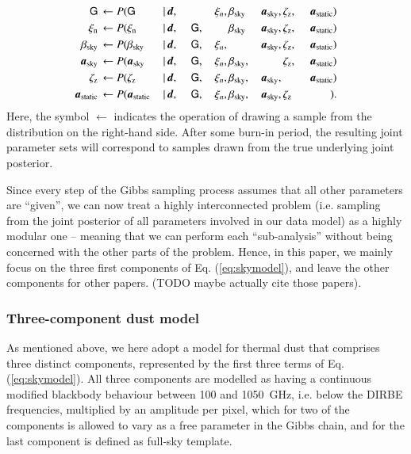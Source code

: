 \documentclass{aa}
\newcommand{\dv}[0]{\vec{d}}
\newcommand{\G}[0]{\tens{G}}
\renewcommand{\a}[0]{\vec{a}}
\begin{document}
\begin{alignat}{11}
\G &\,\leftarrow P(\G&\,\mid &\,\dv,&\, &\,\phantom{\G} &\,\xi_n, &
\,\beta_{\mathrm{sky}}& \,\a_{\mathrm{sky}}, &\,\zeta_{\mathrm{z}},
&\,\a_{\mathrm{static}})\label{eq:gibbs_G}\\
\xi_{\mathrm{n}} &\,\leftarrow P(\xi_{\mathrm{n}}&\,\mid &\,\dv,&\, &\,\G, &\,\phantom{\xi_n} &
\,\beta_{\mathrm{sky}}& \,\a_{\mathrm{sky}}, &\,\zeta_{\mathrm{z}},
&\,\a_{\mathrm{static}})\\
\beta_{\mathrm{sky}} &\,\leftarrow P(\beta_{\mathrm{sky}}&\,\mid &\,\dv,&\, &\,\G, &\,\xi_n, &
\,\phantom{\beta_{\mathrm{sky}}}& \,\a_{\mathrm{sky}}, &\,\zeta_{\mathrm{z}}, &\,\a_{\mathrm{static}})\\
\a_{\mathrm{sky}} &\,\leftarrow P(\a_{\mathrm{sky}}&\,\mid &\,\dv,&\, &\,\G, &\,\xi_n, &
\,\beta_{\mathrm{sky}},& \,\phantom{\a_{\mathrm{sky}},}
&\,\zeta_{\mathrm{z}}, &\,\a_{\mathrm{static}})\\
\zeta_{\mathrm{z}} &\,\leftarrow P(\zeta_{\mathrm{z}}&\,\mid &\,\dv,&\, &\,\G, &\,\xi_n, &
\,\beta_{\mathrm{sky}},& \,\a_{\mathrm{sky}},
&\,\phantom{\zeta_{\mathrm{z}},} &\,\a_{\mathrm{static}})\label{eq:gibbs_zodi}\\
\a_{\mathrm{static}} &\,\leftarrow P(\a_{\mathrm{static}}&\,\mid &\,\dv,&\, &\,\G, &\,\xi_n, &
\,\beta_{\mathrm{sky}},& \,\a_{\mathrm{sky}}, &\,\zeta_{\mathrm{z}} &\,\phantom{\a_{\mathrm{static}}})\label{eq:gibbs_static}.
\end{alignat}
Here, the symbol $\leftarrow$ indicates the operation of drawing a sample from
the distribution on the right-hand side. After some burn-in period, the
resulting joint parameter sets will correspond to samples drawn from the true
underlying joint posterior.

Since every step of the Gibbs sampling process assumes that all other
parameters are ``given'', we can now treat a highly interconnected problem
(i.e. sampling from the joint posterior of all parameters involved in our data
model) as a highly modular one -- meaning that we can perform each
``sub-analysis'' without being concerned with the other parts of the problem.
Hence, in this paper, we mainly focus on the three first components of Eq.
(\ref{eq:skymodel}), and leave the other components for other papers. (TODO
maybe actually cite those papers).

\subsubsection{Three-component dust model}
As mentioned above, we here adopt a model for thermal dust that comprises three
distinct components, represented by the first three terms of Eq.
(\ref{eq:skymodel}). All three components are modelled as having a continuous
modified blackbody behaviour between 100 and 1050~GHz, i.e. below the DIRBE
frequencies, multiplied by an amplitude per pixel, which for two of the
components is allowed to vary as a free parameter in the Gibbs chain, and for
the last component is defined as full-sky template.
\end{document}
